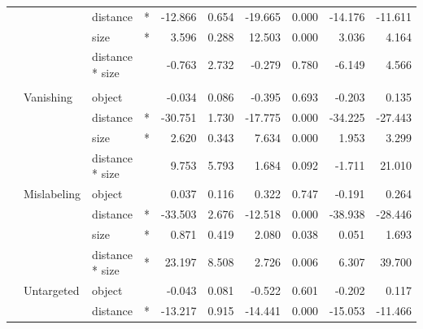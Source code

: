 \begin{longtable}[t]{llllrrrrrr}
\cmidrule{3-10}\nopagebreak
\hspace{1em} &  & distance & * & -12.866 & 0.654 & -19.665 & 0.000 & -14.176 & -11.611\\
\cmidrule{3-10}\nopagebreak
\hspace{1em} &  & size & * & 3.596 & 0.288 & 12.503 & 0.000 & 3.036 & 4.164\\
\cmidrule{3-10}\nopagebreak
\hspace{1em} &  & distance * size &  & -0.763 & 2.732 & -0.279 & 0.780 & -6.149 & 4.566\\
\cmidrule{1-10}\pagebreak[0]
\addlinespace[0.3em]
\multicolumn{10}{l}{\textbf{RetinaNet}}\\
\hspace{1em} & Vanishing & object &  & -0.034 & 0.086 & -0.395 & 0.693 & -0.203 & 0.135\\
\cmidrule{3-10}\nopagebreak
\hspace{1em} &  & distance & * & -30.751 & 1.730 & -17.775 & 0.000 & -34.225 & -27.443\\
\cmidrule{3-10}\nopagebreak
\hspace{1em} &  & size & * & 2.620 & 0.343 & 7.634 & 0.000 & 1.953 & 3.299\\
\cmidrule{3-10}\nopagebreak
\hspace{1em} &  & distance * size &  & 9.753 & 5.793 & 1.684 & 0.092 & -1.711 & 21.010\\
\cmidrule{2-10}\nopagebreak
\hspace{1em} & Mislabeling & object &  & 0.037 & 0.116 & 0.322 & 0.747 & -0.191 & 0.264\\
\cmidrule{3-10}\nopagebreak
\hspace{1em} &  & distance & * & -33.503 & 2.676 & -12.518 & 0.000 & -38.938 & -28.446\\
\cmidrule{3-10}\nopagebreak
\hspace{1em} &  & size & * & 0.871 & 0.419 & 2.080 & 0.038 & 0.051 & 1.693\\
\cmidrule{3-10}\nopagebreak
\hspace{1em} &  & distance * size & * & 23.197 & 8.508 & 2.726 & 0.006 & 6.307 & 39.700\\
\cmidrule{2-10}\nopagebreak
\hspace{1em} & Untargeted & object &  & -0.043 & 0.081 & -0.522 & 0.601 & -0.202 & 0.117\\
\cmidrule{3-10}\nopagebreak
\hspace{1em} &  & distance & * & -13.217 & 0.915 & -14.441 & 0.000 & -15.053 & -11.466\\

\end{longtable}
